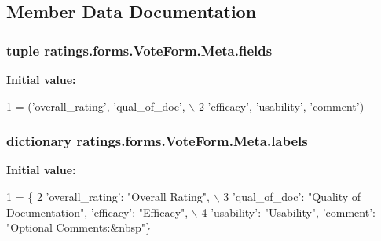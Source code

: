 \subsection{Member Data Documentation}
\hypertarget{classratings_1_1forms_1_1VoteForm_1_1Meta_a181e07f4455cd11384602b077cd16070}{
\subsubsection[{fields}]{\setlength{\rightskip}{0pt plus 5cm}tuple ratings.\-forms.\-Vote\-Form.\-Meta.\-fields\hspace{0.3cm}{\ttfamily [static]}}}\label{classratings_1_1forms_1_1VoteForm_1_1Meta_a181e07f4455cd11384602b077cd16070}
{\bfseries Initial value\-:}
\begin{DoxyCode}
1 = (\textcolor{stringliteral}{'overall\_rating'}, \textcolor{stringliteral}{'qual\_of\_doc'}, \(\backslash\)
2             \textcolor{stringliteral}{'efficacy'}, \textcolor{stringliteral}{'usability'}, \textcolor{stringliteral}{'comment'})
\end{DoxyCode}
\hypertarget{classratings_1_1forms_1_1VoteForm_1_1Meta_a80c82dfd8c58f8a74d813043b67b4030}{
\subsubsection[{labels}]{\setlength{\rightskip}{0pt plus 5cm}dictionary ratings.\-forms.\-Vote\-Form.\-Meta.\-labels\hspace{0.3cm}{\ttfamily [static]}}}\label{classratings_1_1forms_1_1VoteForm_1_1Meta_a80c82dfd8c58f8a74d813043b67b4030}
{\bfseries Initial value\-:}
\begin{DoxyCode}
1 = \{
2             \textcolor{stringliteral}{'overall\_rating'}: \textcolor{stringliteral}{"Overall Rating"}, \(\backslash\)
3             \textcolor{stringliteral}{'qual\_of\_doc'}: \textcolor{stringliteral}{"Quality of Documentation"}, \textcolor{stringliteral}{'efficacy'}: \textcolor{stringliteral}{"Efficacy"}, \(\backslash\)
4             \textcolor{stringliteral}{'usability'}: \textcolor{stringliteral}{"Usability"}, \textcolor{stringliteral}{'comment'}: \textcolor{stringliteral}{"Optional Comments:&nbsp"}\}
\end{DoxyCode}
